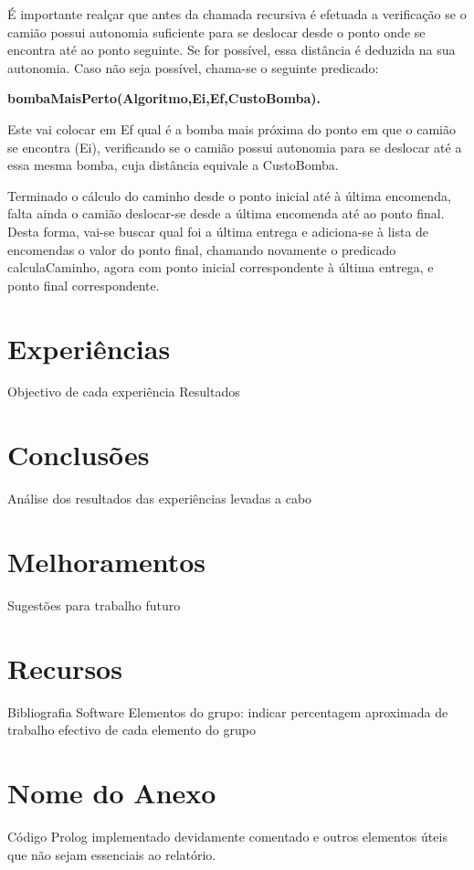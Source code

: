 \documentclass[a4paper]{article}
\begin{document}
É importante realçar que antes da chamada recursiva é efetuada a verificação se o camião possui autonomia suficiente para se deslocar desde o ponto onde se encontra até ao ponto seguinte. Se for possível, essa distância é deduzida na sua autonomia. Caso não seja possível, chama-se o seguinte predicado:

\centerline{\textbf{bombaMaisPerto(Algoritmo,Ei,Ef,CustoBomba).}}

Este vai colocar em Ef qual é a bomba mais próxima do ponto em que o camião se encontra (Ei), verificando se o camião possui autonomia para se deslocar até a essa mesma bomba, cuja distância equivale a CustoBomba. 

Terminado o cálculo do caminho desde o ponto inicial até à última encomenda, falta ainda o camião deslocar-se desde a última encomenda até ao ponto final. Desta forma, vai-se buscar qual foi a última entrega e adiciona-se à lista de encomendas o valor do ponto final, chamando novamente o predicado calculaCaminho, agora com ponto inicial correspondente à última entrega, e ponto final correspondente.

\newpage

\section{Experiências}

Objectivo de cada experiência
Resultados

\newpage

\section{Conclusões}

Análise dos resultados das experiências levadas a cabo

\newpage

\section{Melhoramentos}

Sugestões para trabalho futuro

\newpage

\section{Recursos}

Bibliografia
Software
Elementos do grupo: indicar percentagem aproximada de trabalho efectivo de cada elemento do grupo


\clearpage
{}
\renewcommand\refname{Bibliografia}



\newpage
\appendix
\section{Nome do Anexo}
Código Prolog implementado devidamente comentado e outros elementos úteis que não sejam essenciais ao relatório.
\end{document}
